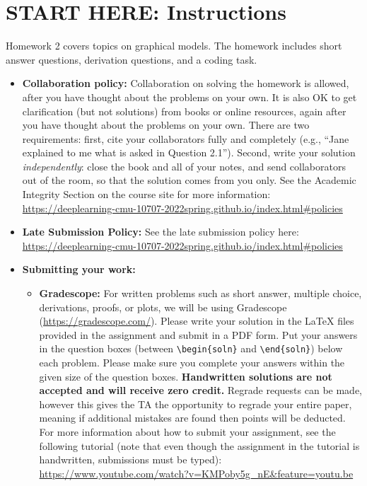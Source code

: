 \section*{START HERE: Instructions}

\begin{notebox}
Homework 2 covers topics on graphical models. 
The homework includes short answer questions, derivation questions, and a coding task. 
\end{notebox}

\begin{itemize}
    \item \textbf{Collaboration policy:} Collaboration on solving the homework is allowed, after you have thought about the problems on your own. It is also OK to get clarification (but not solutions) from books or online resources, again after you have thought about the problems on your own. There are two requirements: first, cite your collaborators fully and completely (e.g., ``Jane explained to me what is asked in Question 2.1''). Second, write your solution {\em independently}: close the book and all of your notes, and send collaborators out of the room, so that the solution comes from you only.  
    See the Academic Integrity Section on the course site for more information: \url{https://deeplearning-cmu-10707-2022spring.github.io/index.html#policies}
    
    \item\textbf{Late Submission Policy:} See the late submission policy here:\\
    \url{https://deeplearning-cmu-10707-2022spring.github.io/index.html#policies}
    
    \item\textbf{Submitting your work:} 

    \begin{itemize}
        \item \textbf{Gradescope:} For written problems such as short answer, multiple choice, derivations, proofs, or plots, we will be using Gradescope (\url{https://gradescope.com/}).
        Please write your solution in the LaTeX files provided in the assignment and submit in a PDF form. Put your answers in the question boxes (between \texttt{\textbackslash begin\{soln\}} and \texttt{\textbackslash end\{soln\}}) below each problem. Please make sure you complete your answers within the given size of the question boxes. \textbf{Handwritten solutions are not accepted and will receive zero credit.} Regrade requests can be made, however this gives the TA the opportunity to regrade your entire paper, meaning if additional mistakes are found then points will be deducted. For more information about how to submit your assignment, see the following tutorial (note that even though the assignment in the tutorial is handwritten, submissions must be typed): \url{https://www.youtube.com/watch?v=KMPoby5g_nE&feature=youtu.be}


\end{itemize}
\end{itemize}
